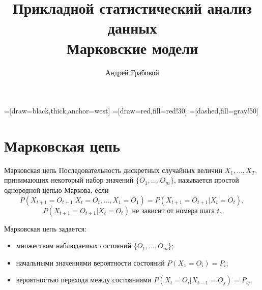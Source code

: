 \newcommand{\tsum}{\mathop{\textstyle\sum}\limits}
\newcommand{\condprob}[2] {\mathbf{P}\!\left(#1\left|#2\right.\right)}

\renewcommand{\leq}{\leqslant}
\renewcommand{\geq}{\geqslant}

\DeclareMathOperator{\FWER}{FWER}
\DeclareMathOperator{\FDR}{FDR}
\newtheorem{Th}{Теорема}
\newtheorem{Def}{Определение}


\title[Марковские модели]{Прикладной статистический анализ данных\\Марковские модели}
\author{Андрей Грабовой}
\date{}


=[draw=black,thick,anchor=west]
=[draw=red,fill=red!30]
=[dashed,fill=gray!50]

\begin{frame}
    \titlepage
\end{frame}


\section{Марковская цепь}

\begin{frame}{Марковская цепь}
Последовательность дискретных случайных величин $X_1, \dots, X_T$, принимающих некоторый набор значений $\{O_1, \dots, O_m\}$, называется простой однородной цепью Маркова, если
\[
    P(X_{t+1} = O_{t+1}| X_{t}=O_{t}, \dots, X_1 = O_1) = P(X_{t+1} = O_{t+1}| X_{t}=O_{t}),
\]
\[
    P(X_{t+1} = O_{t+1}| X_{t}=O_{t}) \text{    не зависит от номера шага }t.
\]

\vspace{1cm}
Марковская цепь задается: 
\begin{itemize}
\item множеством наблюдаемых состояний $\{O_1, \dots, O_m\}$;
\item начальными значениями вероятности состояний $P(X_1 = O_i) = P_i$;
\item вероятностью перехода между состояниями $ P(X_{t} = O_{i}| X_{t-1}=O_{j}) = P_{ij}$.
\end{itemize}
\end{frame}

